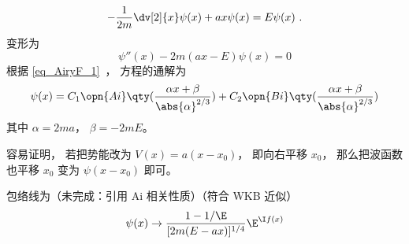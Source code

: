 
\begin{issues}
\issueDraft
\end{issues}


\begin{equation}
-\frac{1}{2m}\dv[2]{x}\psi(x) + ax \psi(x) = E\psi(x)~.
\end{equation}
变形为
\begin{equation}
\psi''(x) - 2m(ax - E)\psi(x) = 0
\end{equation}
根据 \autoref{eq_AiryF_1}~， 方程的通解为
\begin{equation}
\psi(x) = C_1\opn{Ai}\qty(\frac{\alpha x+\beta}{\abs{\alpha}^{2/3}}) + C_2 \opn{Bi}\qty(\frac{\alpha x+\beta}{\abs{\alpha}^{2/3}})
\end{equation}
其中 $\alpha = 2ma$， $\beta = -2mE$。

容易证明， 若把势能改为 $V(x) = a(x-x_0)$， 即向右平移 $x_0$， 那么把波函数也平移 $x_0$ 变为 $\psi(x-x_0)$ 即可。

包络线为（未完成：引用 Ai 相关性质）（符合 WKB 近似）
\begin{equation}
\psi(x) \to \frac{1-1/\E}{[2m(E-ax)]^{1/4}} \E^{\I f(x)}
\end{equation}
